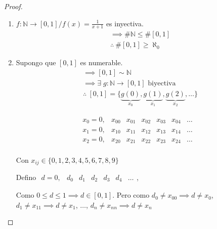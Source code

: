 \begin{proof}\phantom{.}

    \begin{enumerate}
        \item $f: \mathbb{N} \to [0,1] / f(x) = \frac{1}{x+1}$ es inyectiva.
            \begin{align*}
                &\implies \# \mathbb{N} \leq \# [0,1] \\
                &\therefore ~ \# [0,1] \geq \aleph_0
            \end{align*}

        \item Supongo que $[0,1]$ es numerable.
            \begin{align*}
                &\implies [0,1] \sim \mathbb{N} \\
                &\implies \exists \; g:\mathbb{N}\to [0,1] \text{ biyectiva}\\
                &\therefore ~ [0,1] = \{ \underbrace{g(0)}_{x_0}, 
                \underbrace{g(1)}_{x_1}, \underbrace{g(2)}_{x_2}, \dotsc \}
            \end{align*}

            \begin{equation*}
                \begin{matrix}
                    x_0 = 0, & x_{00} & x_{01} & x_{02} & x_{03} & x_{04} 
                            & \dots\\
                    x_1 = 0, & x_{10} & x_{11} & x_{12} & x_{13} & x_{14}
                            & \dots \\
                    x_2 = 0, & x_{20} & x_{21} & x_{22} & x_{23} & x_{24}
                            & \dots \\
                \end{matrix}
            \end{equation*}
            
            Con $x_{ij} \in \{0,1,2,3,4,5,6,7,8,9\}$


            Defino $\begin{matrix} 
                d = 0, & d_0 & d_1 & d_2 & d_3 & d_4 & \dots 
            \end{matrix}$,

            Como $0 \leq d \leq 1 \implies d \in [0,1]$.
            Pero como $d_0 \neq x_{00} \implies d \neq x_0$, 
            $d_1 \neq x_{11} \implies d \neq x_1$, $\dots$,
            $d_n \neq x_{nn} \implies d \neq x_n$


\end{enumerate}
\end{proof}
